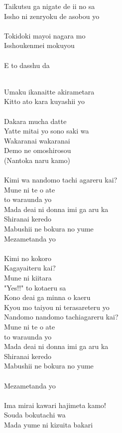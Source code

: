 \begin{multicols}{2}
Taikutsu ga nigate de ii no sa\\
Issho ni zenryoku de asobou yo\\
\\
Tokidoki mayoi nagara mo\\
Isshoukenmei mokuyou\\
\\
\hspace*{0.82cm}E to dasshu da\columnbreak

\\
Umaku ikanaitte akirametara\\
Kitto ato kara kuyashii yo \\
\\
Dakara mucha datte\\
Yatte mitai yo sono saki wa\\
Wakaranai wakaranai\\
Demo ne omoshirosou\\
(Nantoka naru kamo)\\
\\

Kimi wa nandomo tachi agareru kai?\\
Mune ni te o ate\\
 to waraunda yo\\
Mada deai ni donna imi ga aru ka\\
Shiranai keredo\\
Mabushii ne  bokura no yume\\
Mezametanda yo\\

\\

Kimi no kokoro\\
Kagayaiteru kai?\\
Mune ni kiitara\\
"Yes!!" to kotaeru sa\\
Kono deai ga minna o kaeru\\
Kyou mo taiyou ni terasareteru yo\\

Nandomo nandomo tachiagareru kai?\\
Mune ni te o ate\\
 to waraunda yo\\
Mada deai ni donna imi ga aru ka\\
Shiranai keredo\\
Mabushii ne  bokura no yume\\
\\
Mezametanda yo\\
\\

Ima mirai kawari hajimeta kamo!\\
Souda bokutachi wa\\
Mada yume ni kizuita bakari
\end{multicols}

\ifdefined\COMPLETE
\else
	
\fi
